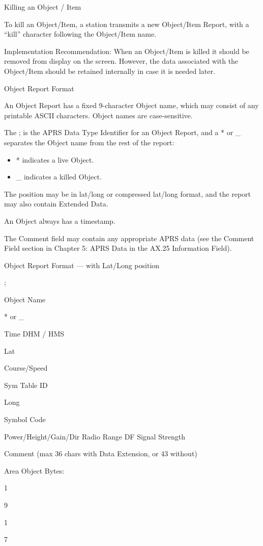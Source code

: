 Killing an
Object / Item

To kill an Object/Item, a station transmits a new Object/Item Report, with a
“kill” character following the Object/Item name.

Implementation Recommendation: When an Object/Item is killed it should be
removed from display on the screen. However, the data associated with the
Object/Item should be retained internally in case it is needed later.


Object Report
Format

An Object Report has a fixed 9-character Object name, which may consist of
any printable ASCII characters.
Object names are case-sensitive.

The ; is the APRS Data Type Identifier for an Object Report, and a * or _
separates the Object name from the rest of the report:

\begin{itemize} %
  
\item * indicates a live Object.
\item _ indicates a killed Object.
\end{itemize}

The position may be in lat/long or compressed lat/long format, and the report
may also contain Extended Data.

An Object always has a timestamp.

The Comment field may contain any appropriate APRS data (see the
Comment Field section in Chapter 5: APRS Data in the AX.25 Information
Field).

Object Report Format — with Lat/Long position

;

Object
Name

*
or
_

Time
DHM /
HMS

Lat

Course/Speed

Sym
Table
ID

Long

Symbol
Code

Power/Height/Gain/Dir
Radio Range
DF Signal Strength

Comment
(max 36 chars with
Data Extension, or
43 without)

Area Object
Bytes:

1

9

1

7

